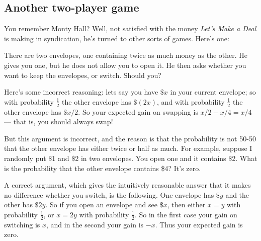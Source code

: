\documentclass[11pt,twoside]{article}
\begin{document}

\iffalse

\subsection{Another two-player game}

You remember Monty Hall?  Well, not satisfied with the money 
{\em Let's Make a Deal} is making in syndication, he's turned to 
other sorts of games.  Here's one: 

There are two envelopes, one containing twice as much money as the
other.  He gives you one, but he does not allow you to open it. He
then asks whether you want to keep the envelopes, or switch.
Should you?

Here's some incorrect reasoning: lets say you have $\$x$ in your
current envelope; so with probability $\frac12$ the other envelope has
$\$(2x)$, and with probability $\frac12$ the other envelope has
$\$x/2$.  So your expected gain on swapping is $x/2 - x/4 = x/4$ ---
that is, you should always swap!

But this argument is incorrect, and the reason is that the probability
is not 50-50 that the other envelope has either twice or half as much.
For example, suppose I randomly put \$1 and \$2 in two envelopes.  
You open one and it contains \$2.  What is the probability that
the other envelope contains \$4?  It's zero.

A correct argument, which gives the intuitively reasonable answer
that it makes no difference whether you switch, is the following.
One envelope has $\$y$ and the other has $\$2y$.  So if you open
an envelope and see $\$x$, then either $x = y$ with probability $\frac12$,
or $x = 2y$ with probability $\frac12$.  So in the first case
your gain on switching is $x$, and in the second your gain is $-x$.
Thus your expected gain is zero.
\end{document}

